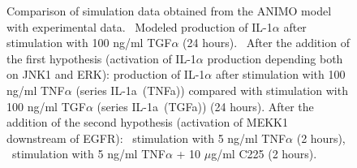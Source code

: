 \begin{figure}[!tpb]
\begin{center}
\end{center}
\caption{\scriptsize
Comparison of simulation data obtained from the ANIMO model with experimental data.
{\bf \protect{}}~Modeled production of IL-1$\alpha$ after stimulation with 100 ng/ml TGF$\alpha$ (24 hours).
{\bf \protect{}}~After the addition of the first hypothesis (activation of IL-1$\alpha$ production depending both
on JNK1 and ERK): production of IL-1$\alpha$ after stimulation with 100 ng/ml TNF$\alpha$ (series {\sf IL-1a~(TNFa)})
compared with stimulation with 100 ng/ml TGF$\alpha$ (series {\sf IL-1a~(TGFa)}) (24 hours).
After the addition of the second hypothesis (activation of MEKK1 downstream of EGFR): {\bf \protect{}}~stimulation with 5 ng/ml TNF$\alpha$ (2 hours),
{\bf \protect{}}~stimulation with 5 ng/ml TNF$\alpha$ + 10 $\mu$g/ml C225 (2 hours).}\label{fig:large-model-graph}
\end{figure}


